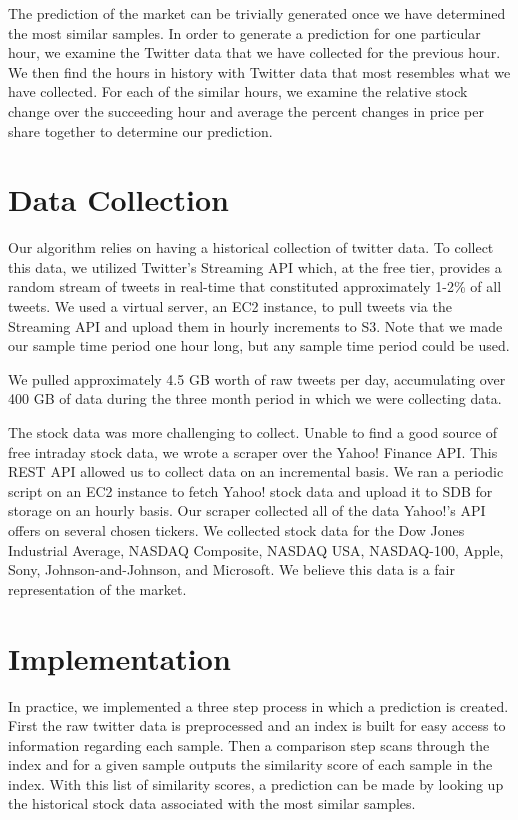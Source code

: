 \documentclass[twocolumn]{article}
\begin{document}
The prediction of the market can be trivially generated once we have determined the most similar samples. In order to generate a prediction for one particular hour, we examine the Twitter data that we have collected for the previous hour. We then find the hours in history with Twitter data that most resembles what we have collected. For each of the similar hours, we examine the relative stock change over the succeeding hour and average the percent changes in price per share together to determine our prediction.

\section{Data Collection}
Our algorithm relies on having a historical collection of twitter data. To collect this data, we utilized Twitter’s Streaming API which, at the free tier, provides a random stream of tweets in real-time that constituted approximately 1-2\% of all tweets. We used a virtual server, an EC2 instance, to pull tweets via the Streaming API and upload them in hourly increments to S3. Note that we made our sample time period one hour long, but any sample time period could be used.

We pulled approximately 4.5 GB worth of raw tweets per day, accumulating over 400 GB of data during the three month period in which we were collecting data. 

The stock data was more challenging to collect. Unable to find a good source of free intraday stock data, we wrote a scraper over the Yahoo! Finance API. This REST API allowed us to collect data on an incremental basis. We ran a periodic script on an EC2 instance to fetch Yahoo! stock data and upload it to SDB for storage on an hourly basis. Our scraper collected all of the data Yahoo!’s API offers on several chosen tickers. We collected stock data for the Dow Jones Industrial Average, NASDAQ Composite, NASDAQ USA, NASDAQ-100, Apple, Sony, Johnson-and-Johnson, and Microsoft. We believe this data is a fair representation of the market.

\section{Implementation}
In practice, we implemented a three step process in which a prediction is created. First the raw twitter data is preprocessed and an index is built for easy access to information regarding each sample. Then a comparison step scans through the index and for a given sample outputs the similarity score of each sample in the index. With this list of similarity scores, a prediction can be made by looking up the historical stock data associated with the most similar samples.
\end{document}
